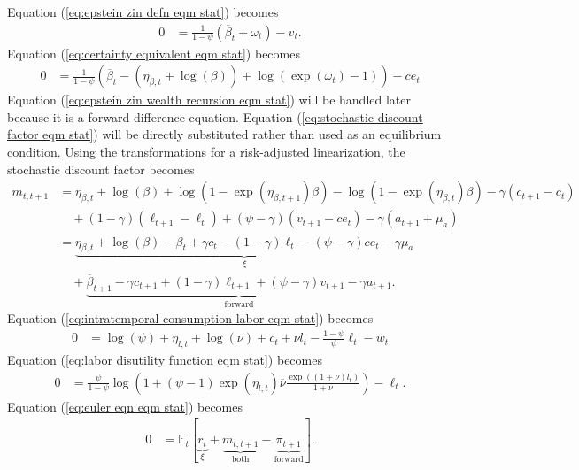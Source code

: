 \documentclass[12 pt, oneside]{article}
\theoremstyle{definition}
\theoremstyle{definition}
\theoremstyle{definition}
\newcommand{\E}{\mathbb{E}}
\begin{document}
Equation (\ref{eq:epstein zin defn eqm stat}) becomes
\begin{align*}
  0 & = \frac{1}{1 - \psi}(\overline{\beta}_t + \omega_t) - v_t.
\end{align*}
Equation (\ref{eq:certainty equivalent eqm stat}) becomes
\begin{align*}
  0 & = \frac{1}{1 - \psi}(\overline{\beta}_t - (\eta_{\beta, t} + \log(\beta)) + \log(\exp(\omega_t) - 1)) - ce_t
\end{align*}
Equation (\ref{eq:epstein zin wealth recursion eqm stat}) will be handled later because it is a forward difference equation. Equation (\ref{eq:stochastic discount factor eqm stat}) will be directly substituted rather than used as an equilibrium condition. Using the transformations for a risk-adjusted linearization, the stochastic discount factor becomes
\begin{align*}
  m_{t, t + 1} & = \eta_{\beta, t} + \log(\beta)  + \log(1 - \exp(\eta_{\beta, t + 1})\beta) - \log(1 - \exp(\eta_{\beta, t}) \beta) - \gamma (c_{t + 1} - c_t) \\
               &\quad + (1 - \gamma)(\ell_{t + 1} - \ell_t) + (\psi - \gamma)(v_{t + 1} - ce_t) - \gamma(a_{t + 1} + \mu_a)\\
               & = \underbrace{\eta_{\beta, t} + \log(\beta) - \overline{\beta}_t + \gamma c_t - (1 - \gamma) \ell_t - (\psi - \gamma) ce_t - \gamma \mu_a}_{\xi} \\
               &\quad + \underbrace{\overline{\beta}_{t + 1} - \gamma c_{t + 1} + (1 - \gamma) \ell_{t + 1} + (\psi - \gamma) v_{t + 1} - \gamma a_{t + 1}}_{\text{forward}}.
\end{align*}
Equation (\ref{eq:intratemporal consumption labor eqm stat}) becomes
\begin{align*}
  0 & = \log(\psi) + \eta_{l, t} + \log(\overline{\nu}) + c_t + \nu l_t - \frac{1 - \psi}{\psi}\ell_t - w_t
\end{align*}
Equation (\ref{eq:labor disutility function eqm stat}) becomes
\begin{align*}
  0 & = \frac{\psi}{1 - \psi}\log\left(1 + (\psi - 1)\exp(\eta_{l, t})\overline{\nu}\frac{\exp((1 + \nu)l_t)}{1 + \nu}\right) - \ell_t.
\end{align*}
Equation (\ref{eq:euler eqn eqm stat}) becomes
\begin{align*}
  0 & = \E_t\left[\underbrace{r_t}_{\xi} + \underbrace{m_{t, t + 1}}_{\text{both}} - \underbrace{\pi_{t + 1}}_{\text{forward}}\right].
\end{align*}
\end{document}
